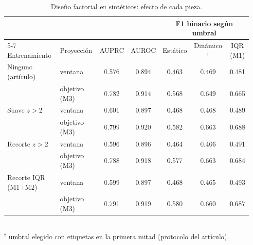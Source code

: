 \begin{table}[t]
\centering\small
\caption{Diseño factorial en sintéticos: efecto de cada pieza.}
\label{tab:fact}
\begin{tabular}{llccccc}
\toprule
& & & & \multicolumn{3}{c}{F1 binario según umbral} \\ \cmidrule(lr){5-7}
Entrenamiento & Proyección & AUPRC & AUROC & Estático & Dinámico$^\dagger$ & IQR (M1) \\
\midrule
Ninguno (artículo) & ventana & 0.576 & 0.894 & 0.463 & 0.469 & 0.481 \\
 & objetivo (M3) & 0.782 & 0.914 & 0.568 & 0.649 & 0.665 \\
\midrule
Suave $z>2$ & ventana & 0.601 & 0.897 & 0.468 & 0.468 & 0.489 \\
 & objetivo (M3) & 0.799 & 0.920 & 0.582 & 0.663 & 0.688 \\
\midrule
Recorte $z>2$ & ventana & 0.596 & 0.896 & 0.464 & 0.466 & 0.491 \\
 & objetivo (M3) & 0.788 & 0.918 & 0.577 & 0.663 & 0.684 \\
\midrule
Recorte IQR (M1+M2) & ventana & 0.599 & 0.897 & 0.468 & 0.465 & 0.493 \\
 & objetivo (M3) & 0.791 & 0.919 & 0.580 & 0.660 & 0.687 \\
\bottomrule
\end{tabular}
\\[2pt]{\footnotesize $^\dagger$ umbral elegido con etiquetas en la primera mitad (protocolo del artículo).}
\end{table}

